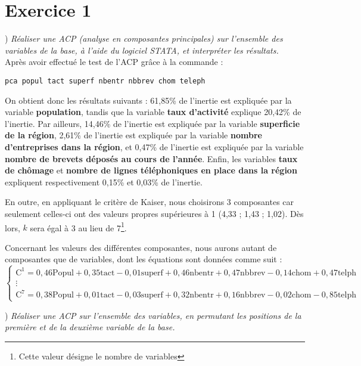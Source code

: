 \section*{Exercice 1}
) \textit{Réaliser une ACP (analyse en composantes principales) sur l’ensemble des variables de la base, à l’aide du logiciel STATA, et interpréter les résultats.} \\

Après avoir effectué le test de l'ACP grâce à la commande : 
\begin{lstlisting}[style=Stata]
	pca popul tact superf nbentr nbbrev chom teleph
\end{lstlisting}

On obtient donc les résultats suivants : 61,85\% de l'inertie est expliquée par la variable \textbf{population}, tandis que la variable \textbf{taux d'activité} explique 20,42\% de l'inertie. Par ailleurs, 14,46\% de l'inertie est expliquée par la variable \textbf{superficie de la région}, 2,61\% de l'inertie est expliquée par la variable \textbf{nombre d'entreprises dans la région}, et 0,47\% de l'inertie est expliquée par la variable \textbf{nombre de brevets déposés au cours de l'année}. Enfin, les variables \textbf{taux de chômage} et \textbf{nombre de lignes téléphoniques en place dans la région} expliquent respectivement 0,15\% et 0,03\% de l'inertie.

En outre, en appliquant le critère de Kaiser, nous choisirons 3 composantes car seulement celles-ci ont des valeurs propres supérieures à 1 (4,33 ; 1,43 ; 1,02). Dès lors, $k$ sera égal à 3 au lieu de 7\footnote{Cette valeur désigne le nombre de variables}.

Concernant les valeurs des différentes composantes, nous aurons autant de composantes que de variables, dont les équations sont données comme suit :
\vspace*{-.5cm}
\[
\begin{cases}
	\text{C}^1 = 0,46 \text{Popul} + 0,35 \text{tact} - 0,01 \text{superf} + 0,46 \text{nbentr} + 0,47 \text{nbbrev} - 0,14 \text{chom} + 0,47 \text{telph}\\
		\vdots\\
	\text{C}^7 = 0,38 \text{Popul} + 0,01 \text{tact} - 0,03 \text{superf} + 0,32 \text{nbentr} + 0,16 \text{nbbrev} - 0,02 \text{chom} - 0,85 \text{telph}
\end{cases}
\]

)\textit{ Réaliser une ACP sur l’ensemble des variables, en permutant les positions de la première et de la deuxième variable de la base.}\\

